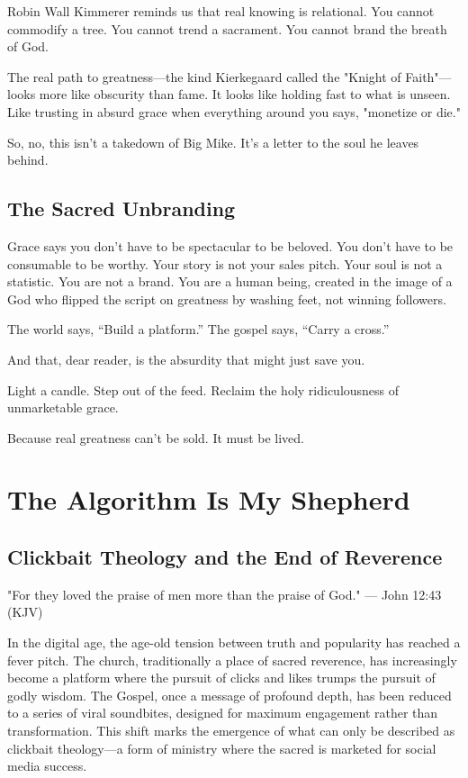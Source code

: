 \documentclass[a4paper,11pt]{book}
\begin{document}
Robin Wall Kimmerer reminds us that real knowing is relational. You cannot commodify a tree. You cannot trend a sacrament. You cannot brand the breath of God.

The real path to greatness—the kind Kierkegaard called the "Knight of Faith"—looks more like obscurity than fame. It looks like holding fast to what is unseen. Like trusting in absurd grace when everything around you says, "monetize or die."

So, no, this isn’t a takedown of Big Mike. It’s a letter to the soul he leaves behind.

\section{The Sacred Unbranding}

Grace says you don’t have to be spectacular to be beloved. You don’t have to be consumable to be worthy. Your story is not your sales pitch. Your soul is not a statistic. You are not a brand. You are a human being, created in the image of a God who flipped the script on greatness by washing feet, not winning followers.

The world says, “Build a platform.” The gospel says, “Carry a cross.”

And that, dear reader, is the absurdity that might just save you.

Light a candle. Step out of the feed. Reclaim the holy ridiculousness of unmarketable grace.

Because real greatness can’t be sold. It must be lived.

\chapter{The Algorithm Is My Shepherd}

\section{Clickbait Theology and the End of Reverence}

"For they loved the praise of men more than the praise of God." — John 12:43 (KJV)

In the digital age, the age-old tension between truth and popularity has reached a fever pitch. The church, traditionally a place of sacred reverence, has increasingly become a platform where the pursuit of clicks and likes trumps the pursuit of godly wisdom. The Gospel, once a message of profound depth, has been reduced to a series of viral soundbites, designed for maximum engagement rather than transformation. This shift marks the emergence of what can only be described as clickbait theology—a form of ministry where the sacred is marketed for social media success.
\end{document}
